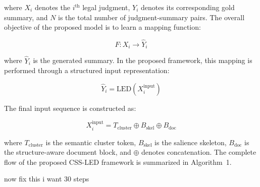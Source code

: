 \documentclass[11pt, a4paper]{article}
\theoremstyle{plain}%
\theoremstyle{remark}%
\theoremstyle{definition}%
\begin{document}
where \(X_i\) denotes the \(i^{\text{th}}\) legal judgment, \(Y_i\) denotes its corresponding gold summary, and \(N\) is the total number of judgment-summary pairs. The overall objective of the proposed model is to learn a mapping function:

\begin{equation}
F: X_i \rightarrow \hat{Y}_i
\end{equation}

where \(\hat{Y}_i\) is the generated summary. In the proposed framework, this mapping is performed through a structured input representation:

\begin{equation}
\hat{Y}_i = \mathrm{LED}(X_i^{\text{input}})
\end{equation}

The final input sequence is constructed as:

\begin{equation}
X_i^{\text{input}} =
T_{\text{cluster}} \oplus B_{\text{skel}} \oplus B_{\text{doc}}
\end{equation}

where \(T_{\text{cluster}}\) is the semantic cluster token, \(B_{\text{skel}}\) is the salience skeleton, \(B_{\text{doc}}\) is the structure-aware document block, and \(\oplus\) denotes concatenation. The complete flow of the proposed CSS-LED framework is summarized in Algorithm~1.

now fix this i want 30 steps 
\end{document}
